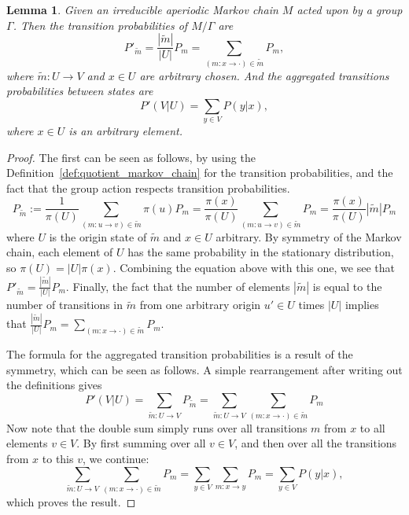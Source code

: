 \documentclass{article}
\newtheorem{lemma}{Lemma}
\theoremstyle{definition}
\begin{document}
\begin{lemma}\label{lem:transitions_group_quotient}
    Given an irreducible aperiodic Markov chain $M$ acted upon by a group $\Gamma$. Then the transition probabilities of $M/\Gamma$ are 
    \[
       P'_{\widetilde{m}} = \frac{|\widetilde{m}|}{|U|}P_m = \sum_{(m:x\to \cdot) \in \widetilde{m}} P_m,
    \]
    where $\widetilde{m}: U\to V$ and $x\in U$ are arbitrary chosen.
    And the aggregated transitions probabilities between states are
    \[
       P'(V|U) = \sum_{y\in V} P(y|x),
    \]
    where $x\in U$ is an arbitrary element.
\end{lemma}
\begin{proof}
    The first can be seen as follows, by using the Definition~\ref{def:quotient_markov_chain} for the transition probabilities, and the fact that the group action respects transition probabilities.
    \begin{equation*}
        P_{\widetilde{m}} 
            := \frac{1}{\pi(U)} \sum_{(m:u\to v)\in\widetilde{m}}\pi(u)P_m
            = \frac{\pi(x)}{\pi(U)} \sum_{(m:u\to v)\in\widetilde{m}}P_m
            = \frac{\pi(x)}{\pi(U)} |\widetilde{m}| P_m
    \end{equation*}
    where $U$ is the origin state of $\widetilde{m}$ and $x\in U$ arbitrary. By symmetry of the Markov chain, each element of $U$ has the same probability in the stationary distribution, so $\pi(U) = |U| \pi(x)$. Combining the equation above with this one, we see that $P'_{\widetilde{m}}=\frac{|\widetilde{m}|}{|U|}P_m$. Finally, the fact that the number of elements $|\widetilde{m}|$ is equal to the number of transitions in $\widetilde{m}$ from one arbitrary origin $u'\in U$ times $|U|$ implies that $\frac{|\widetilde{m}|}{|U|}P_m = \sum_{(m:x\to \cdot) \in \widetilde{m}} P_m$.    

    The formula for the aggregated transition probabilities is a result of the symmetry, which can be seen as follows. A simple rearrangement after writing out the definitions gives
    \begin{equation*}
       P'(V|U) 
            = \sum_{\widetilde{m}:U\to V} P_{\widetilde{m}}
            = \sum_{\widetilde{m}:U\to V} \sum_{(m:x\to \cdot) \in \widetilde{m}} P_m
    \end{equation*}
    Now note that the double sum simply runs over all transitions $m$ from $x$ to all elements $v\in V$. By first summing over all $v\in V$, and then over all the transitions from $x$ to this $v$, we continue:
    \begin{equation*}            
       \sum_{\widetilde{m}:U\to V} \sum_{(m:x\to \cdot) \in \widetilde{m}} P_m
            = \sum_{y\in V} \sum_{m:x\to y} P_m 
            = \sum_{y\in V} P(y|x),
    \end{equation*}
    which proves the result.
\end{proof}
\end{document}
